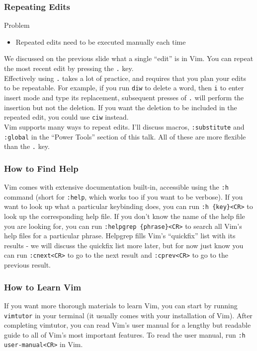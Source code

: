 \documentclass{beamer}
\begin{document}
\begin{frame}[fragile]
    \frametitle{Repeating Edits}
    \begin{block}{Problem}
	\begin{itemize}
	    \item Repeated edits need to be executed manually each time
	\end{itemize}
    \end{block}
    We discussed on the previous slide what a single \enquote{edit} is in Vim. You can repeat the most recent edit by pressing the \verb+.+ key.\\
    \vspace{0.5cm}
    Effectively using \verb+.+ takes a lot of practice, and requires that you plan your edits to be repeatable. For example, if you run \verb+diw+ to delete a word, then \verb+i+ to enter insert mode and type its replacement, subsequent presses of \verb+.+ will perform the insertion but not the deletion. If you want the deletion to be included in the repeated edit, you could use \verb+ciw+ instead.\\
    \vspace{0.5cm}
    Vim supports many ways to repeat edits. I'll discuss macros, \verb+:substitute+ and \verb+:global+ in the \enquote{Power Tools} section of this talk. All of these are more flexible than the \verb+.+ key.
\end{frame}

\begin{frame}[fragile]
    \frametitle{How to Find Help}
    Vim comes with extensive documentation built-in, accessible using the \verb+:h+ command (short for \verb+:help+, which works too if you want to be verbose). If you want to look up what a particular keybinding does, you can run \verb+:h {key}<CR>+ to look up the corresponding help file. If you don't know the name of the help file you are looking for, you can run \verb+:helpgrep {phrase}<CR>+ to search all Vim's help files for a particular phrase. Helpgrep fills Vim's \enquote{quickfix} list with its results - we will discuss the quickfix list more later, but for now just know you can run \verb+:cnext<CR>+ to go to the next result and \verb+:cprev<CR>+ to go to the previous result.
\end{frame}

\begin{frame}[fragile]
    \frametitle{How to Learn Vim}
    If you want more thorough materials to learn Vim, you can start by running \verb+vimtutor+ in your terminal (it usually comes with your installation of Vim). After completing vimtutor, you can read Vim's user manual for a lengthy but readable guide to all of Vim's most important features. To read the user manual, run \verb+:h user-manual<CR>+ in Vim.
\end{frame}
\end{document}
